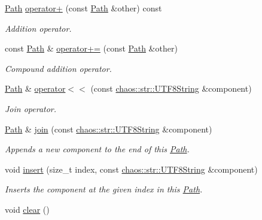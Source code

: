 \begin{DoxyCompactItemize}
\hyperlink{classchaos_1_1io_1_1sys_1_1_path}{Path} \hyperlink{classchaos_1_1io_1_1sys_1_1_path_a5e769fd87717e15f0580e9aacbc0a418}{operator+} (const \hyperlink{classchaos_1_1io_1_1sys_1_1_path}{Path} \&other) const 
\begin{DoxyCompactList}\small\item\em Addition operator. \end{DoxyCompactList}\item 
const \hyperlink{classchaos_1_1io_1_1sys_1_1_path}{Path} \& \hyperlink{classchaos_1_1io_1_1sys_1_1_path_a92a616d9f16047d8933020bab54ed494}{operator+=} (const \hyperlink{classchaos_1_1io_1_1sys_1_1_path}{Path} \&other)
\begin{DoxyCompactList}\small\item\em Compound addition operator. \end{DoxyCompactList}\item 
\hyperlink{classchaos_1_1io_1_1sys_1_1_path}{Path} \& \hyperlink{classchaos_1_1io_1_1sys_1_1_path_a7d48246eb29402efb63beca6b935ab31}{operator$<$$<$} (const \hyperlink{classchaos_1_1str_1_1_u_t_f8_string}{chaos\+::str\+::\+U\+T\+F8\+String} \&component)
\begin{DoxyCompactList}\small\item\em Join operator. \end{DoxyCompactList}\item 
\hyperlink{classchaos_1_1io_1_1sys_1_1_path}{Path} \& \hyperlink{classchaos_1_1io_1_1sys_1_1_path_ab5714556d695c6c5c3d87bfe546a5162}{join} (const \hyperlink{classchaos_1_1str_1_1_u_t_f8_string}{chaos\+::str\+::\+U\+T\+F8\+String} \&component)
\begin{DoxyCompactList}\small\item\em Appends a new component to the end of this \hyperlink{classchaos_1_1io_1_1sys_1_1_path}{Path}. \end{DoxyCompactList}\item 
void \hyperlink{classchaos_1_1io_1_1sys_1_1_path_a6488f8b326f13f0180c72f9f7e7a412e}{insert} (size\+\_\+t index, const \hyperlink{classchaos_1_1str_1_1_u_t_f8_string}{chaos\+::str\+::\+U\+T\+F8\+String} \&component)
\begin{DoxyCompactList}\small\item\em Inserts the component at the given index in this \hyperlink{classchaos_1_1io_1_1sys_1_1_path}{Path}. \end{DoxyCompactList}\item 
void \hyperlink{classchaos_1_1io_1_1sys_1_1_path_a7c4cd7e5d8e21a8c522f8a87f1e90f4c}{clear} ()

\end{DoxyCompactItemize}
